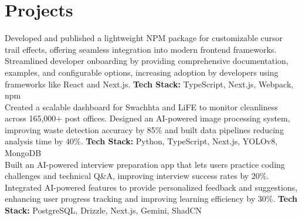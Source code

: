 \section{Projects}
\resumeSubHeadingListStart

  {
    Developed and published a lightweight NPM package for customizable cursor trail effects, offering seamless integration into modern frontend frameworks. Streamlined developer onboarding by providing comprehensive documentation, examples, and configurable options, increasing adoption by developers using frameworks like React and Next.js.
    \newline \textbf{Tech Stack:} TypeScript, Next.js, Webpack, npm
  } \\[1.2em]

  {
    Created a scalable dashboard for Swachhta and LiFE to monitor cleanliness across 165,000+ post offices. Designed an AI-powered image processing system, improving waste detection accuracy by 85\% and built data pipelines reducing analysis time by 40\%.
    \newline \textbf{Tech Stack:} Python, TypeScript, Next.js, YOLOv8, MongoDB
  } \\[1.2em]

  {
    Built an AI-powered interview preparation app that lets users practice coding challenges and technical Q&A, improving interview success rates by 20\%. Integrated AI-powered features to provide personalized feedback and suggestions, enhancing user progress tracking and improving learning efficiency by 30\%.
    \newline \textbf{Tech Stack:} PostgreSQL, Drizzle, Next.js, Gemini, ShadCN
  }

\resumeSubHeadingListEnd
\\[1.5em]
